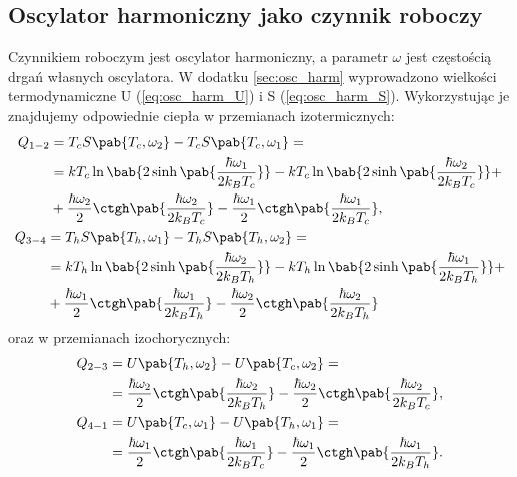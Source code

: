 \subsection{Oscylator harmoniczny jako czynnik roboczy}
Czynnikiem roboczym jest oscylator harmoniczny, a parametr \(\omega\) jest częstością drgań własnych oscylatora. W dodatku \ref{sec:osc_harm} wyprowadzono wielkości termodynamiczne U (\ref{eq:osc_harm_U}) i S (\ref{eq:osc_harm_S}). Wykorzystując je znajdujemy odpowiednie ciepła w przemianach izotermicznych:
\begin{gather}
\begin{split}
	Q_{1-2} &= T_c S\pab{T_c,\omega_2} - T_c S\pab{T_c,\omega_1} = \\ &=
	kT_c \ln\bab{2\sinh\pab{\frac{\hbar\omega_1}{2k_B T_c}}} -
	kT_c \ln\bab{2\sinh\pab{\frac{\hbar\omega_2}{2k_B T_c}}} + \\ &+
	\frac{\hbar\omega_2}{2} \ctgh\pab{\frac{\hbar\omega_2}{2k_B T_c}} -
	\frac{\hbar\omega_1}{2} \ctgh\pab{\frac{\hbar\omega_1}{2k_B T_c}},
\end{split} \\
\begin{split}
	Q_{3-4} &= T_h S\pab{T_h,\omega_1} - T_h S\pab{T_h,\omega_2} = \\ &=
	kT_h \ln\bab{2\sinh\pab{\frac{\hbar\omega_2}{2k_B T_h}}} -
	kT_h \ln\bab{2\sinh\pab{\frac{\hbar\omega_1}{2k_B T_h}}} + \\ &+
	\frac{\hbar\omega_1}{2} \ctgh\pab{\frac{\hbar\omega_1}{2k_B T_h}} -
	\frac{\hbar\omega_2}{2} \ctgh\pab{\frac{\hbar\omega_2}{2k_B T_h}}
\end{split}
\end{gather}
oraz w przemianach izochorycznych:
\begin{gather}
\begin{split}
	Q_{2-3} &= U\pab{T_h,\omega_2} - U\pab{T_c,\omega_2} = \\ &=
	\frac{\hbar\omega_2}{2}\ctgh\pab{\frac{\hbar\omega_2}{2k_B T_h}} -
	\frac{\hbar\omega_2}{2}\ctgh\pab{\frac{\hbar\omega_2}{2k_B T_c}},
\end{split} \\
\begin{split}
	Q_{4-1} &= U\pab{T_c,\omega_1} - U\pab{T_h,\omega_1} = \\ &=
	\frac{\hbar\omega_1}{2}\ctgh\pab{\frac{\hbar\omega_1}{2k_B T_c}} -
	\frac{\hbar\omega_1}{2}\ctgh\pab{\frac{\hbar\omega_1}{2k_B T_h}}.
\end{split}
\end{gather}

